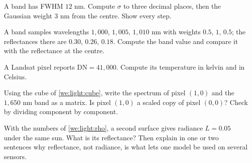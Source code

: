 \begin{checkyourself}
\item\label{ex:light:1} A band has FWHM $12$ nm. Compute $\sigma$ to three decimal places, then the
Gaussian weight $3$ nm from the centre. Show every step.
\item\label{ex:light:2} A band samples wavelengths $1{,}000$, $1{,}005$, $1{,}010$ nm with weights
$0.5$, $1$, $0.5$; the reflectances there are $0.30$, $0.26$, $0.18$. Compute the band value and
compare it with the reflectance at the centre.
\item\label{ex:light:3} A Landsat pixel reports $\mathrm{DN} = 41{,}000$. Compute its temperature in
kelvin and in Celsius.
\item\label{ex:light:4} Using the cube of \cref{we:light:cube}, write the spectrum of pixel
$(1,0)$ and the $1{,}650$ nm band as a matrix. Is pixel $(1,0)$ a scaled copy of pixel $(0,0)$?
Check by dividing component by component.
\item\label{ex:light:5} With the numbers of \cref{we:light:rho}, a second surface gives radiance
$L = 0.05$ under the same sun. What is its reflectance? Then explain in one or two sentences why
reflectance, not radiance, is what lets one model be used on several sensors.
\end{checkyourself}

